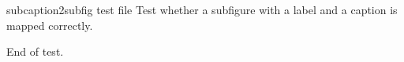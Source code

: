subcaption2subfig test file
Test whether a subfigure with a label and a caption is mapped correctly.


End of test.
